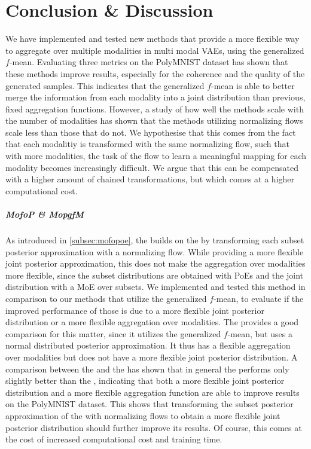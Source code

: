\chapter{Conclusion \& Discussion}
We have implemented and tested new methods that provide a more flexible way to aggregate over multiple modalities in multi modal VAEs, using the generalized $f$-mean.
Evaluating three metrics on the PolyMNIST dataset has shown that these methods improve results, especially for the coherence and the quality of the generated samples.
This indicates that the generalized $f$-mean is able to better merge the information from each modality into a joint distribution than previous, fixed aggregation functions.
However, a study of how well the methods scale with the number of modalities has shown that the methods utilizing normalizing flows scale less than those that do not.
We hypothesise that this comes from the fact that each modalitiy is transformed with the same normalizing flow, such that with more modalities, the task of the flow to learn a meaningful mapping for each modality becomes increasingly difficult.
We argue that this can be compensated with a higher amount of chained transformations, but which comes at a higher computational cost.

\paragraph{MofoP \& MopgfM}
As introduced in \cref{subsec:mofopoe}, the  builds on the  by transforming each subset posterior approximation with a normalizing flow.
While providing a more flexible joint posterior approximation, this does not make the aggregation over modalities more flexible, since the subset distributions are obtained with PoEs and the joint distribution with a MoE over subsets.
We implemented and tested this method in comparison to our methods that utilize the generalized $f$-mean, to evaluate if the improved performance of those is due to a more flexible joint posterior distribution or a more flexible aggregation over modalities.
The  provides a good comparison for this matter, since it utilizes the generalized $f$-mean, but uses a normal distributed posterior approximation.
It thus has a flexible aggregation over modalities but does not have a more flexible joint posterior distribution.
A comparison between the  and the  has shown that in general the  performs only slightly better than the , indicating that both a more flexible joint posterior distribution and a more flexible aggregation function are able to improve results on the PolyMNIST dataset.
This shows that transforming the subset posterior approximation of the  with normalizing flows to obtain a more flexible joint posterior distribution should further improve its results.
Of course, this comes at the cost of increased computational cost and training time.

